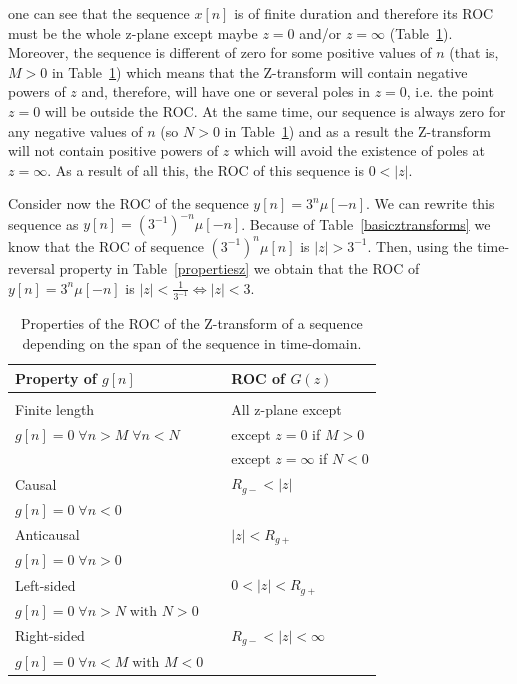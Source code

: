 \documentclass[a4paper,11pt,oneside]{article}
\begin{document}
\begin{itemize}
one can see that the sequence $x[n]$ is of finite duration and therefore its ROC must be the whole z-plane except maybe $z=0$ and/or $z=\infty$ (Table~\ref{propertiesz2}). Moreover, the sequence is different of zero for some positive values of $n$ (that is, $M>0$ in Table~\ref{propertiesz2}) which means that the Z-transform will contain negative powers of $z$ and, therefore, will have one or several poles in $z=0$, i.e. the point $z=0$ will be outside the ROC. At the same time, our sequence is always zero for any negative values of $n$ (so $N>0$ in Table~\ref{propertiesz2}) and as a result the Z-transform will not contain positive powers of $z$ which will avoid the existence of poles at $z=\infty$. As a result of all this, the ROC of this sequence is $0<|z|$.

Consider now the ROC of the sequence $y[n]=3^n\mu[-n]$. We can rewrite this sequence as $y[n]=(3^{-1})^{-n}\mu[-n]$. Because of Table~\ref{basicztransforms} we know that the ROC of sequence $(3^{-1})^n\mu[n]$ is $|z|>3^{-1}$. Then, using the time-reversal property in Table~\ref{propertiesz} we obtain that the ROC of $y[n]=3^n\mu[-n]$ is $|z|<\frac{1}{3^{-1}}\Leftrightarrow |z|<3$. 

\begin{table}
\centering
\vspace{1cm}
\begin{tabular}{lll}
\hline
\hline
Property of $g[n]$ & & ROC of $G(z)$\\ 
\hline
\hline
&&\vspace{-0.3cm}\\
Finite length&&All z-plane except\\
$g[n]=0\;\forall n>M\;\forall n<N$&&except $z=0$ if $M>0$\\
&&except $z=\infty$ if $N<0$\vspace{.2cm}\\
\hline
Causal & \quad & $R_{g-}<|z|$\\
$g[n]=0\;\forall n<0$&&\vspace{.2cm}\\
\hline
Anticausal& \quad & $|z|<R_{g+}$\\
$g[n]=0\;\forall n>0$ &&\vspace{.2cm}\\
\hline
Left-sided &\quad & $0<|z|<R_{g+}$\\
$g[n]=0\;\forall n>N\;\textrm{with } N>0$&&\vspace{.2cm}\\
\hline
Right-sided &\quad & $R_{g-}<|z|<\infty$\\
$g[n]=0\;\forall n<M\;\textrm{with } M<0$&&\vspace{.2cm}\\
\hline
\end{tabular}
\caption{Properties of the ROC of the Z-transform of a sequence depending on the span of the sequence in time-domain.}
\label{propertiesz2}
\end{table}
\vspace{1cm}



\end{itemize}
\end{document}
